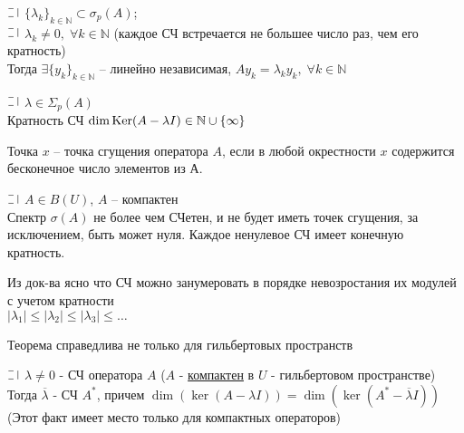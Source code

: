 \begin{lemma}[5]
  $\letus$ $\{\lambda_k\}_{k \in \mathbb{N}} \subset \sigma_p(A)$;\\
  $\letus$ $\lambda_k \not = 0, \; \forall k \in \mathbb{N}$ (каждое СЧ встречается не большее число раз, чем его кратность)\\
  Тогда $\exists \{y_k\}_{k \in \mathbb{N}}$ -- линейно независимая, $Ay_k = \lambda_k y_k, \; \forall k \in \mathbb{N}$
\end{lemma}

\begin{definition}
  $\letus$ $\lambda \in \Sigma_p(A)$\\
  Кратность СЧ $\dim\text{Ker}(A - \lambda I) \in \mathbb{N} \cup \{\infty\}$
\end{definition}

\begin{definition}
Точка $x$ -- точка сгущения оператора $A$,
если в любой окрестности $x$ содержится бесконечное число элементов из А.
\end{definition}

\begin{theorem}
  $\letus$ $A \in B(U)$, $A$ -- компактен\\
  Спектр $\sigma(A)$ не более чем СЧетен, и не будет иметь точек сгущения, за исключением, быть может нуля.
  Каждое ненулевое СЧ имеет конечную кратность.
\end{theorem}

\begin{zam}[1]
  Из док-ва ясно что СЧ можно занумеровать в порядке невозростания их модулей с учетом кратности \\
  $|\lambda_1|\le|\lambda_2|\le|\lambda_3|\le \dots$
\end{zam}

\begin{zam}[2]
  Теорема справедлива не только для гильбертовых пространств
\end{zam}

\begin{theorem}
  $\letus$ $\lambda \not = 0$ - СЧ оператора $A$ ($A$ - \underline{компактен}  в $U$ - гильбертовом пространстве)\\
  Тогда $\overline{\lambda}$ - СЧ $A^*$, причем $\dim(\ker(A -\lambda I)) = \dim(\ker(A^*-\overline{\lambda}I))$
  (Этот факт имеет место только для компактных операторов)
\end{theorem}

